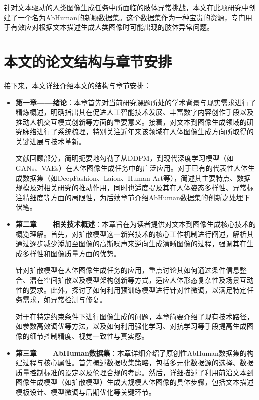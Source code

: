 针对文本驱动的人类图像生成任务中所面临的肢体异常挑战，本文在此项研究中创建了一个名为AbHuman的新颖数据集。这个数据集作为一种宝贵的资源，专门用于有效应对根据文本描述生成人类图像时可能出现的肢体异常问题。



\section{本文的论文结构与章节安排}

\label{sec:arrangement}

接下来，本文详细介绍本文的结构与章节安排：

\begin{itemize}
\item \textbf{第一章——绪论}：本章首先对当前研究课题所处的学术背景与现实需求进行了精炼概述，明确指出其在促进人工智能技术发展、丰富数字内容创作手段以及推动人机交互模式创新等方面的重要意义。接着，对文本到图像生成领域的研究脉络进行了系统梳理，特别关注近年来该领域在人体图像生成方向所取得的关键进展与技术革新。

  文献回顾部分，简明扼要地勾勒了从DDPM，到现代深度学习模型（如GANs、VAEs）在人体图像生成任务中的广泛应用。对于已有的代表性人体生成数据集（如DeepFashion、Laion、Human-Art等），简述其主要特点、数据规模及对相关研究的推动作用，同时也适度提及其在人体姿态多样性、异常标注精细度等方面的局限性，为后续章节介绍AbHuman数据集的创新之处埋下伏笔。

\item \textbf{第二章——相关技术概述}：本章旨在为读者提供对文本到图像生成核心技术的概览理解。首先，对扩散模型这一新兴技术的核心工作机制进行阐述，解析其通过逐步减少添加至图像的高斯噪声来逆向生成清晰图像的过程，强调其在生成多样性和图像质量方面的优势。

  针对扩散模型在人体图像生成任务的应用，重点讨论其如何通过条件信息整合、潜在空间扩散以及模型架构创新等方式，适应人体形态复杂性及场景互动性的要求。此外，探讨了如何利用预训练模型进行针对性微调，以满足特定任务需求，如异常检测与修复。

  对于在特定约束条件下进行图像生成的问题，本章简要介绍了现有技术路径，如参数高效调优等方法，以及如何利用强化学习、对抗学习等手段提高生成图像的细节控制精度、视觉一致性与真实感。

\item \textbf{第三章——AbHuman数据集}：本章详细介绍了原创性AbHuman数据集的构建过程与核心属性。首先概述数据收集策略，包括多元化数据源的选择、数据质量控制标准的设定以及伦理合规的考虑。然后，详细描述了利用前沿文本到图像生成模型（如扩散模型）生成大规模人体图像的具体步骤，包括文本描述模板设计、模型微调与后期优化等关键环节。


\end{itemize}
